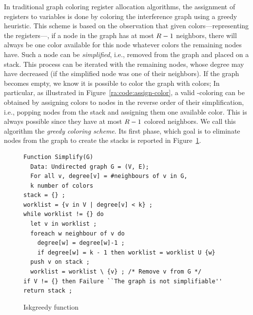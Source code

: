 {In traditional graph coloring register allocation algorithms, the assignment of registers to variables is done by coloring the interference graph using a greedy heuristic.
This scheme is based on the observation that given \regs colors---representing the registers---, if a node in the graph has at most $R-1$ neighbors, there will always be one color available for this node whatever colors the remaining nodes have.
Such a node can be \emph{simplified}, i.e., removed from the graph and placed on a stack.
This process can be iterated with the remaining nodes, whose degree may have decreased (if the simplified node was one of their neighbors).
If the graph becomes empty, we know it is possible to color the graph with \regs colors; 
In particular, as illustrated in Figure~\ref{ra:code:assign-color}, a valid \regs-coloring can be obtained by assigning colors to nodes in the reverse order of their simplification, i.e., popping nodes from the stack and assigning them one available color.
This is always possible since they have at most $R-1$ colored neighbors.
We call this algorithm the \emph{greedy coloring scheme}.
Its first phase, which goal is to eliminate nodes from the graph to create the stacks is reported in Figure~\ref{code:is-k-greedy}.


\begin{figure}
\begin{verbatim}
Function Simplify(G)
  Data: Undirected graph G = (V, E);
  For all v, degree[v] = #neighbours of v in G,
  k number of colors
stack = {} ;
worklist = {v in V | degree[v] < k} ;
while worklist != {} do
  let v in worklist ;
  foreach w neighbour of v do
    degree[w] = degree[w]-1 ;
    if degree[w] = k - 1 then worklist = worklist U {w}
  push v on stack ;
  worklist = worklist \ {v} ; /* Remove v from G */
if V != {} then Failure ``The graph is not simplifiable''
return stack ;
\end{verbatim}
\caption{Iskgreedy function}
\label{code:is-k-greedy}
\end{figure}


}
